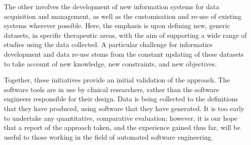The other involves the development of new information systems for data
acquisition and management, as well as the customisation and re-use of
existing systems wherever possible.  Here, the emphasis is upon
defining new, generic datasets, in specific therapeutic areas, with
the aim of supporting a wide range of studies using the data
collected.  A particular challenge for informatics development and
data re-use stems from the constant updating of these datasets to take
account of new knowledge, new constraints, and new objectives.

Together, these initiatives provide an initial validation of the
approach.  The software tools are in use by clinical researchers,
rather than the software engineers responsible for their design.  Data
is being collected to the definitions that they have produced, using
software that they have generated.  It is too early to undertake any
quantitative, comparative evaluation; however, it is our hope that a
report of the approach taken, and the experience gained thus far, will
be useful to those working in the field of automated software
engineering.

